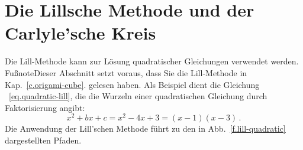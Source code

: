 
\section{Die Lillsche Methode und der Carlyle'sche Kreis}\label{s.lill-quadratic}

Die Lill-Methode kann zur Lösung quadratischer Gleichungen verwendet werden. Fußnote{Dieser Abschnitt setzt voraus, dass Sie die Lill-Methode in Kap.~\ref{c.origami-cube}.} gelesen haben. Als Beispiel dient die Gleichung ~\ref{eq.quadratic-lill}, die die Wurzeln einer quadratischen Gleichung durch Faktorisierung angibt:
\[
x^2+bx+c=x^2-4x+3= (x-1)(x-3)\,.
\]
Die Anwendung der Lill'schen Methode führt zu den in Abb.~\ref{f.lill-quadratic} dargestellten Pfaden.


